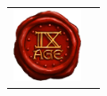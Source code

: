 \begin{titlepage}
\begin{center}
\fi

\vfill

\ifdefined\thisistherulebook

\strut

\else

\begin{tabular}{@{}m{2cm}@{\hskip 20pt}m{13cm}@{}}
\includegraphics[width=2cm]{../Layout/pics/seal_9th.png} &
{\fontsize{10}{12}\selectfont \greytextcolor{%
\ifdefined\thisisthepathsbook%
	\noindent\frontpagecreditswithoutblue%
\else
	\ifdefined\thisisasupplement%
		\noindent\frontpagecreditsnohowtoread%
	\else%
		\noindent\frontpagecredits%
	\fi%
\fi%
}}

\vspace*{10pt}
\noindent{\fontsize{10}{12}\selectfont \greytextcolor{\license}}
\tabularnewline
\end{tabular}

\ifdefined\thisisasupplementarmy
	{\fontsize{10}{12}\selectfont \greytextcolor{\supplementarmydisclaimer{}}}
\fi


\fi

\end{center}
\end{titlepage}

\setcounter{page}{2}
